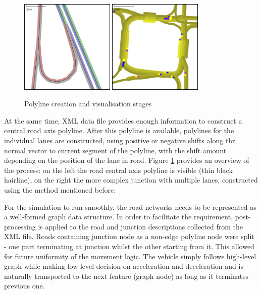 \begin{figure}[h]
    \caption{Polyline creation and visualisation stages}
    \label{fig:roadAndLanesPolylines}
    \centering
    \includegraphics[width=0.4\textwidth]{figs/road/road_polyline.png}
    \hspace{0.2em}
    \includegraphics[width=0.4\textwidth]{figs/road/road_lanes.png}
\end{figure}

At the same time, XML data file provides enough information to construct a central road axis polyline. After this polyline is available, polylines for the individual lanes are constructed, using positive or negative shifts along thr normal vector to current segment of the polyline, with the shift amount depending on the position of the lane in road. Figure \ref{fig:roadAndLanesPolylines} provides an overview of the process: on the left the road central axis polyline is visible (thin black hairline), on the right the more complex junction with multiple lanes, constructed using the method mentioned before.

For the simulation to run smoothly, the road networks needs to be represented as a well-formed graph data structure. In order to facilitate the requirement, post-processing is applied to the road and junction descriptions collected from the XML file. Roads containing junction node as a non-edge polyline node were split - one part terminating at junction whilst the other starting from it. This allowed for future uniformity of the movement logic. The vehicle simply follows high-level graph while making low-level decision on acceleration and deceleration and is naturally transported to the next feature (graph node) as long as it terminates previous one.

